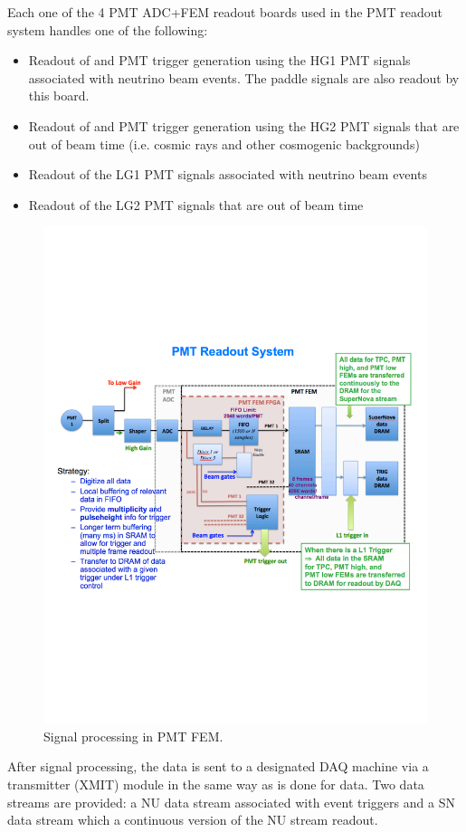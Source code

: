 Each one of the 4 PMT ADC+FEM readout boards used in the PMT readout system handles one of the following:

\begin{itemize}
\item Readout of and PMT trigger generation using the HG1 PMT signals associated with neutrino beam events. The paddle signals are also readout by this board. 
\item Readout of and PMT trigger generation using the HG2 PMT signals that are out of beam time (i.e. cosmic rays and other cosmogenic backgrounds) 
\item Readout of the LG1 PMT signals associated with neutrino beam events
\item Readout of the LG2 PMT signals that are out of beam time
\end{itemize}

\begin{figure}
\centering
\includegraphics[width=0.8\linewidth]{./figures/readout_7}%
\caption{\label{fig:readout_7}Signal processing in PMT FEM.}
\end{figure}

After signal processing, the data is sent to a designated DAQ machine via a transmitter (XMIT) module in the same way as is done for \lartpc data. Two data streams are provided: a NU data stream associated with event triggers and a SN data stream which a continuous version of the NU stream readout.

